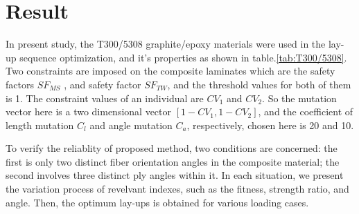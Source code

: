 \section{Result}
In present study, the T300/5308 graphite/epoxy materials were used in the
lay-up sequence optimization, and it's properties as shown in
table.\ref{tab:T300/5308}. Two constraints are imposed on the composite
laminates which are the safety factors $SF_{MS}$ , and safety factor $SF_{TW}$,
and the threshold values for both of them is 1. The constraint values of an
individual are $CV_1$ and $CV_2$. So the mutation vector here is a two
dimensional vector $[1 - CV_1, 1 - CV_2 ]$, and the coefficient of length
mutation $C_l$ and angle mutation $C_a$, respectively, chosen here is 20 and 10. 

To verify the reliablity of proposed method, two conditions are concerned: the
first is only two distinct fiber orientation angles in the composite material;
the second involves three distinct ply angles within it. In each situation,
we present the variation process of revelvant indexes, such as the fitness,
strength ratio, and angle. Then, the optimum lay-ups is obtained for various
loading cases.

